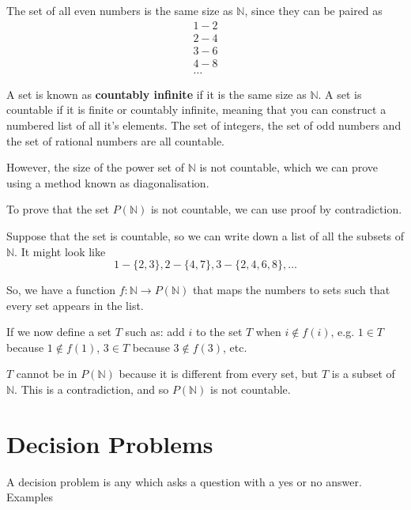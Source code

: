 \begin{example*}{}{}
  The set of all even numbers is the same size as $\mathbb{N}$, since they can be paired as
  \begin{gather*}
    1 - 2\\
    2 - 4\\
    3 - 6\\
    4 - 8\\
    \ldots
  \end{gather*}
\end{example*}

A set is known as \textbf{countably infinite} if it is the same size as $\mathbb{N}$. A set is countable if it is finite
 or countably infinite, meaning that you can construct a numbered list of all it's elements. The set of integers, the
 set of odd numbers and the set of rational numbers are all countable.

However, the size of the power set of $\mathbb{N}$ is not countable, which we can prove using a method known as
 diagonalisation.

\begin{example*}{}{}
  To prove that the set $P(\mathbb{N})$ is not countable, we can use proof by contradiction.

  Suppose that the set is countable, so we can write down a list of all the subsets of $\mathbb{N}$. It might look like
  \begin{equation*}
    1 - \{2, 3\}, 2 - \{4, 7\}, 3 - \{2, 4, 6, 8\}, \ldots
  \end{equation*}

  So, we have a function $f : \mathbb{N} \rightarrow P(\mathbb{N})$ that maps the numbers to sets such that every set
   appears in the list.

  If we now define a set $T$ such as: add $i$ to the set $T$ when $i \notin f(i)$, e.g. $1 \in T$ because
   $1 \notin f(1)$, $3 \in T$ because $3 \notin f(3)$, etc.

  $T$ cannot be in $P(\mathbb{N})$ because it is different from every set, but $T$ is a subset of $\mathbb{N}$. This is
   a contradiction, and so $P(\mathbb{N})$ is not countable.
\end{example*}

\section*{Decision Problems}

A decision problem is any which asks a question with a yes or no answer. {Examples}

